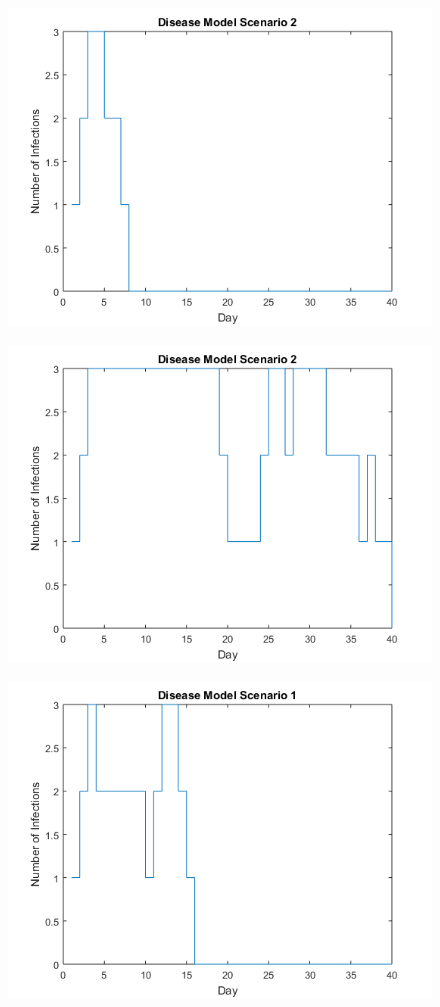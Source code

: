 \documentclass[12pt]{article}
\numberwithin{equation}{section}
\begin{document}
\begin{figure}[bp]
\includegraphics{modelsc2b}
\end{figure}
\begin{figure}[tp]
\includegraphics{modelsc2c}
\end{figure}
\begin{figure}[bp]
\includegraphics{modelsc1a}
\end{figure}
\end{document}
